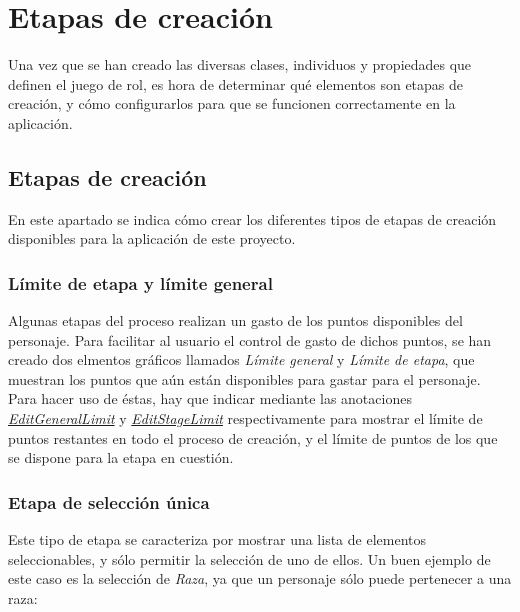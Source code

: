 
\section{Etapas de creación}
Una vez que se han creado las diversas clases, individuos y propiedades que definen el juego de rol, es hora de 
determinar qué elementos son etapas de creación, y cómo configurarlos para que se funcionen correctamente en la aplicación.

\subsection{Etapas de creación}
En este apartado se indica cómo crear los diferentes tipos de etapas de creación disponibles para la aplicación de este proyecto.

\subsubsection{Límite de etapa y límite general}
Algunas etapas del proceso realizan un gasto de los puntos disponibles del personaje. Para facilitar al usuario el control 
de gasto de dichos puntos, se han creado dos elmentos gráficos llamados \textit{Límite general} y \textit{Límite de etapa}, 
que muestran los puntos que aún están disponibles para gastar para el personaje. Para hacer uso de éstas, 
hay que indicar mediante las anotaciones \textit{\underline{EditGeneralLimit}} y \textit{\underline{EditStageLimit}} respectivamente
para mostrar el límite de puntos restantes en todo el proceso de creación, y el límite de puntos de los que se dispone para la 
etapa en cuestión.

\subsubsection{Etapa de selección única}
Este tipo de etapa se caracteriza por mostrar una lista de elementos seleccionables, y sólo permitir la selección de uno de ellos.
Un buen ejemplo de este caso es la selección de \textit{Raza}, ya que un personaje sólo puede pertenecer a una raza:

